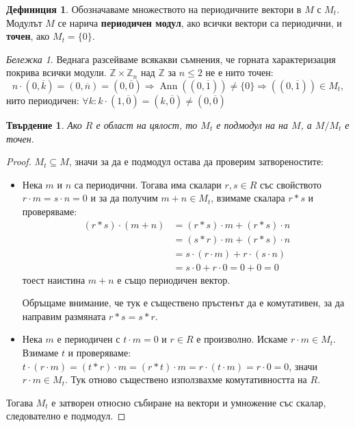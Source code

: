 \documentclass{article}
\newif\ifusemulticols
\newcommand\newterm[1]{\textbf{#1}}
\theoremstyle{definition}
\newtheorem{deff}{Дефиниция}
\theoremstyle{remark}
\newtheorem*{note}{Бележка}
\theoremstyle{plain}
\theoremstyle{plain}
\newtheorem{prop}[theorem]{Твърдение}
\newenvironment{mymulticols}
    { \ifusemulticols \begin{multicols}{2} \fi }
    { \ifusemulticols \end{multicols} \fi }
\DeclareMathOperator{\Ann}{Ann}
\newcommand{\Z}{\mathbb{Z}}
\begin{document}
\begin{mymulticols}
\begin{deff}
    Обозначаваме множеството на периодичните вектори в $M$ с $M_t$.
    Модулът $M$ се нарича \newterm{периодичен модул}, ако всички вектори са периодични, и
    \newterm{точен}, ако $M_t = \{0\}$.
\end{deff}

\begin{note}
    Веднага разсейваме всякакви съмнения, че горната характеризация покрива всички модули.
%
    $\Z \times \Z_n$ над $\Z$ за $n \le 2$ не е нито точен: $$n \cdot (0, \overline k) = (0,
    \overline n) = (0, \overline 0) \Rightarrow \Ann \left((0, \overline 1)\right) \neq \{ 0 \}
    \Rightarrow \left((0,\overline 1)\right)\in M_t,$$ нито периодичен: $\forall k: k \cdot (1,
    \overline 0) = (k, \overline 0) \neq (0, \overline 0)$

\end{note}

\begin{prop}
    \label{torsion-prop}
    Ако $R$ е област на цялост, то $M_t$ е подмодул на на $M$, а $M / M_t$ е точен.
\end{prop}
\begin{proof}
    $M_t \subseteq M$, значи за да е подмодул остава да проверим затвореностите:
    \begin{itemize}
        \item Нека $m$ и $n$ са периодични. Тогава има скалари $r, s \in R$ със свойството $r\cdot m
            = s\cdot n = 0$ и за да получим $m+n \in M_t$, взимаме скалара $r*s$ и проверяваме:
            \begin{align*}
                (r*s)\cdot(m+n) &= (r*s)\cdot m + (r*s)\cdot n \\
                                &= (s*r)\cdot m + (r*s)\cdot n \\
                                &= s\cdot(r \cdot m) + r \cdot (s\cdot n)\\
                                &= s\cdot 0 + r\cdot 0 = 0 + 0 = 0
            \end{align*}
            тоест наистина $m + n$ е също периодичен вектор.

            Обръщаме внимание, че тук е съществено пръстенът да е комутативен, за да направим
            размяната $r*s = s*r$.
        \item Нека $m$ е периодичен с $t \cdot m = 0$ и $r \in R$ е произволно.
            Искаме $r\cdot m \in M_t$.
            Взимаме $t$ и проверяваме: $t \cdot (r \cdot m) = (t*r) \cdot m = (r*t) \cdot m = r
            \cdot (t \cdot m) = r \cdot 0 = 0$, значи $r \cdot m \in M_t$. Тук отново съществено
            използвахме комутативността на $R$.
    \end{itemize}
    Тогава $M_t$ е затворен относно събиране на вектори и умножение със скалар, следователно е
    подмодул.


\end{proof}
\end{mymulticols}
\end{document}
